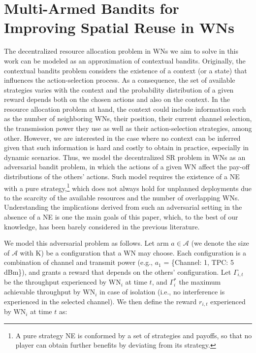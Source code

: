 \documentclass[preprint,12pt]{elsarticle}
\begin{document}
\section{Multi-Armed Bandits for Improving Spatial Reuse in WNs}
\label{section:mabs}	
The decentralized resource allocation problem in WNs we aim to solve in this work can be modeled as an approximation of contextual bandits. Originally, the contextual bandits problem considers the existence of a context (or a state) that influences the action-selection process. As a consequence, the set of available strategies varies with the context and the probability distribution of a given reward depends both on the chosen actions and also on the context. In the resource allocation problem at hand, the context could include information such as the number of neighboring WNs, their position, their current channel selection, the transmission power they use as well as their action-selection strategies, among other. However, we are interested in the case where no context can be inferred given that such information is hard and costly to obtain in practice, especially in dynamic scenarios. Thus, we model the decentralized SR problem in WNs as an adversarial bandit problem, in which the actions of a given WN affect the pay-off distributions of the others' actions. Such model requires the existence of a NE with a pure strategy,\footnote{A pure strategy NE is conformed by a set of strategies and payoffs, so that no player can obtain further benefits by deviating from its strategy.} which does not always hold for unplanned deployments due to the scarcity of the available resources and the number of overlapping WNs. Understanding the implications derived from such an adversarial setting in the absence of a NE is one the main goals of this paper, which, to the best of our knowledge, has been barely considered in the previous literature.

We model this adversarial problem as follows. Let arm $a \in \mathcal{A}$ (we denote the size of $\mathcal{A}$ with K) be a configuration that a WN may choose. Each configuration is a combination of channel and transmit power (e.g., $a_1$ = \{Channel: 1, TPC: 5 dBm\}), and grants a reward that depends on the others' configuration. Let $\Gamma_{i,t}$ be the throughput experienced by $\text{WN}_i$ at time $t$, and $\Gamma_{i}^*$ the maximum achievable throughput by $\text{WN}_i$ in case of isolation (i.e., no interference is experienced in the selected channel). We then define the reward $r_{i,t}$ experienced by $\text{WN}_i$ at time $t$ as:
\end{document}
